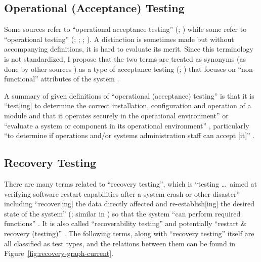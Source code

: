 \subsection{Operational (Acceptance) Testing}
Some sources refer to ``operational acceptance testing'' (\citealp[p.~22]{IEEE2022};
\citealpISTQB{}) while some refer to ``operational testing''
(\citealp[p.~6-9,~in the context of software engineering operations]{SWEBOK2024};
\citealp{ISO_IEC2018}; \citealp[p.~303]{IEEE2017};
\citealp[pp.~4-6,~4-9]{SWEBOK2014}). A distinction is sometimes made
\citep[p.~30]{Firesmith2015} but without accompanying definitions, it is hard
to evaluate its merit. Since this terminology is not standardized, I
propose that the two terms are treated as synonyms (as done by other sources
\citep{LambdaTest2024, BocchinoAndHamilton1996}) as a type of
acceptance testing (\citealp[p.~22]{IEEE2022}; \citealpISTQB{}) that focuses on
``non-functional'' attributes of the system \citep{LambdaTest2024}
.

A summary of given definitions of ``operational (acceptance) testing'' is that
it is ``test[ing] to determine the correct
installation, configuration and operation of a module and that it operates
securely in the operational environment'' \citep{ISO_IEC2018} or ``evaluate a
system or component in its operational environment'' \citep[p.~303]{IEEE2017},
particularly ``to determine if operations and/or systems administration staff
can accept [it]'' \citepISTQB{}.

\subsection{Recovery Testing}
\label{rec-test-ambiguity}

There are many terms related to ``recovery testing'', which is ``testing
\dots\ aimed at verifying
software restart capabilities after a system crash or other disaster''
\citep[p.~5-9]{SWEBOK2024} including ``recover[ing] the data directly affected
and re-establish[ing] the desired state of the system'' (\citealp{ISO_IEC2023a};
similar in \citealp[p.~7-10]{SWEBOK2024}) so
that the system ``can perform required functions'' \citep[p.~370]{IEEE2017}.
It is also called ``recoverability testing'' \cite[p.~47]{Kam2008} and
potentially ``restart \& recovery (testing)'' \cite[Fig.~5]{Gerrard2000a}. The
following terms, along with ``recovery testing'' itself \citep[p.~22]{IEEE2022}
are all classified as test types, and the relations between them can be found
in Figure~\ref{fig:recovery-graph-current}.

